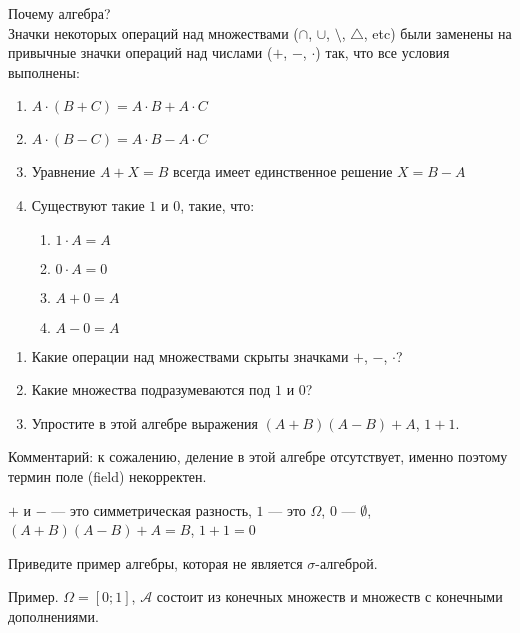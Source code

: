 \begin{problem}
 Почему алгебра? \\
Значки некоторых операций над множествами ($\cap$, $\cup$,
$\setminus$, $\triangle$, etc) были заменены на привычные значки
операций над числами ($+$, $-$, $\cdot$) так, что все условия выполнены:
\begin{enumerate}
\item $A\cdot(B+C)=A\cdot B+A\cdot C$ \\
\item $A\cdot(B-C)=A\cdot B-A\cdot C$ \\
\item Уравнение $A+X=B$ всегда имеет единственное решение $X=B-A$ \\
\item Существуют такие $1$ и $0$, такие, что: \\
\begin{enumerate}
\item $1\cdot A=A$ \\
\item $0\cdot A=0$ \\
\item $A+0=A$ \\
\item $A-0=A$
\end{enumerate}
\end{enumerate}
\begin{enumerate}
\item Какие операции над множествами скрыты значками $+$, $-$,
$\cdot$?
\item Какие множества подразумеваются под $1$ и $0$?
\item Упростите в этой алгебре выражения $(A+B)(A-B)+A$, $1+1$.
\end{enumerate}
Комментарий: к сожалению, деление в этой алгебре отсутствует,
именно поэтому термин поле (field) некорректен.

\begin{sol}
$+$ и $-$ — это симметрическая разность, $1$ — это $\Omega$, $0$ — $\emptyset$, $(A+B)(A-B)+A=B$, $1+1=0$
\end{sol}
\end{problem}

\begin{problem}
Приведите пример алгебры, которая не является $\sigma$-алгеброй.

\begin{sol}
Пример. $\Omega=[0;1]$, $\mathcal{A}$ состоит из конечных множеств и множеств с конечными дополнениями.
\end{sol}
\end{problem}

